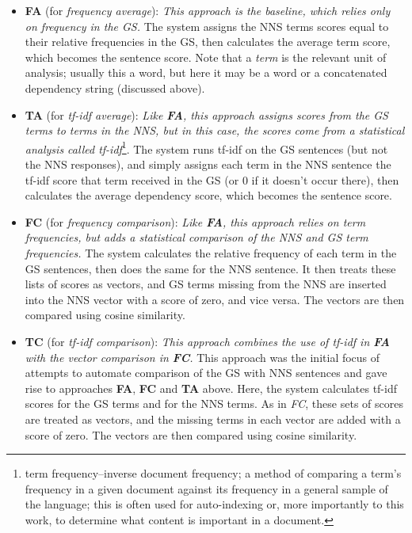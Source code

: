 \begin{itemize}
\item{\textbf{FA} (for \textit{frequency average}): \textit{This approach is the baseline, which relies only on frequency in the GS.} The system assigns the NNS terms scores equal to their relative frequencies in the GS, then calculates the average term score, which becomes the sentence score. Note that a \textit{term} is the relevant unit of analysis; usually this a word, but here it may be a word or a concatenated dependency string (discussed above).}
\item{\textbf{TA} (for \textit{tf-idf average}): \textit{Like \textbf{FA}, this approach assigns scores from the GS terms to terms in the NNS, but in this case, the scores come from a statistical analysis called tf-idf}\footnote{term frequency--inverse document frequency; a method of comparing a term's frequency in a given document against its frequency in a general sample of the language; this is often used for auto-indexing or, more importantly to this work, to determine what content is important in a document.}. The system runs tf-idf on the GS sentences (but not the NNS responses), and simply assigns each term in the NNS sentence the tf-idf score that term received in the GS (or 0 if it doesn't occur there), then calculates the average dependency score, which becomes the sentence score.}
\item{\textbf{FC} (for \textit{frequency comparison}): \textit{Like \textbf{FA}, this approach relies on term frequencies, but adds a statistical comparison of the NNS and GS term frequencies.} The system calculates the relative frequency of each term in the GS sentences, then does the same for the NNS sentence. It then treats these lists of scores as vectors, and GS terms missing from the NNS are inserted into the NNS vector with a score of zero, and vice versa. The vectors are then compared using cosine similarity.}
\item{\textbf{TC} (for \textit{tf-idf comparison}): \textit{This approach combines the use of tf-idf in \textbf{FA} with the vector comparison in \textbf{FC}.} This approach was the initial focus of attempts to automate comparison of the GS with NNS sentences and gave rise to approaches \textbf{FA}, \textbf{FC} and \textbf{TA} above. Here, the system calculates tf-idf scores for the GS terms and for the NNS terms. As in \textit{FC}, these sets of scores are treated as vectors, and the missing terms in each vector are added with a score of zero. The vectors are then compared using cosine similarity.}
\end{itemize}
